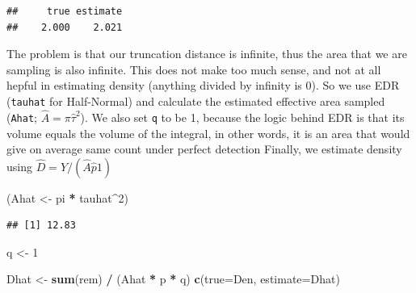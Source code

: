 \documentclass[12pt,]{book}
\newenvironment{Shaded}{\begin{snugshade}}{\end{snugshade}}
\newcommand{\DataTypeTok}[1]{\textcolor[rgb]{0.13,0.29,0.53}{#1}}
\newcommand{\DecValTok}[1]{\textcolor[rgb]{0.00,0.00,0.81}{#1}}
\newcommand{\KeywordTok}[1]{\textcolor[rgb]{0.13,0.29,0.53}{\textbf{#1}}}
\newcommand{\NormalTok}[1]{#1}
\newcommand{\OperatorTok}[1]{\textcolor[rgb]{0.81,0.36,0.00}{\textbf{#1}}}
\newcommand{\StringTok}[1]{\textcolor[rgb]{0.31,0.60,0.02}{#1}}
\begin{document}
\begin{Shaded}
\end{Shaded}

\begin{verbatim}
##     true estimate 
##    2.000    2.021
\end{verbatim}

The problem is that our truncation distance is infinite,
thus the area that we are sampling is also infinite.
This does not make too much sense, and not at all hepful
in estimating density (anything divided by infinity is 0).
So we use EDR (\texttt{tauhat} for Half-Normal) and calculate
the estimated effective area sampled (\texttt{Ahat}; \(\hat{A}=\pi \hat{\tau}^2\)).
We also set \texttt{q} to be 1, because the logic behind EDR is that its
volume equals the volume of the integral, in other words,
it is an area that would give on average same count under perfect detection
Finally, we estimate density using \(\hat{D}=Y/(\hat{A} \hat{p}1)\)

\begin{Shaded}
\begin{Highlighting}[]
\NormalTok{(Ahat <-}\StringTok{ }\NormalTok{pi }\OperatorTok{*}\StringTok{ }\NormalTok{tauhat}\OperatorTok{^}\DecValTok{2}\NormalTok{)}
\end{Highlighting}
\end{Shaded}

\begin{verbatim}
## [1] 12.83
\end{verbatim}

\begin{Shaded}
\begin{Highlighting}[]
\NormalTok{q <-}\StringTok{ }\DecValTok{1}

\NormalTok{Dhat <-}\StringTok{ }\KeywordTok{sum}\NormalTok{(rem) }\OperatorTok{/}\StringTok{ }\NormalTok{(Ahat }\OperatorTok{*}\StringTok{ }\NormalTok{p }\OperatorTok{*}\StringTok{ }\NormalTok{q)}
\KeywordTok{c}\NormalTok{(}\DataTypeTok{true=}\NormalTok{Den, }\DataTypeTok{estimate=}\NormalTok{Dhat)}
\end{Highlighting}
\end{Shaded}
\end{document}
